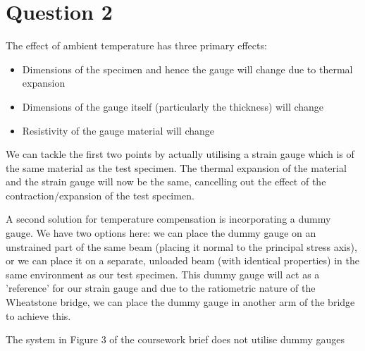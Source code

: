 \documentclass[12pt]{article}
\numberwithin{equation}{section}
\begin{document}
\section{Question 2}
The effect of ambient temperature has three primary effects:
\begin{itemize}
  \item Dimensions of the specimen and hence the gauge will change due to thermal expansion
  \item Dimensions of the gauge itself (particularly the thickness) will change
  \item Resistivity of the gauge material will change
\end{itemize}
We can tackle the first two points by actually utilising a strain gauge which is of the same material as the test specimen. The thermal expansion of the material and the strain gauge will now be the same, cancelling out the effect of the contraction/expansion of the test specimen.

A second solution for temperature compensation is incorporating a dummy gauge. We have two options here: we can place the dummy gauge on an unstrained part of the same beam (placing it normal to the principal stress axis), or we can place it on a separate, unloaded beam (with identical properties) in the same environment as our test specimen. This dummy gauge will act as a 'reference' for our strain gauge and due to the ratiometric nature of the Wheatstone bridge, we can place the dummy gauge in another arm of the bridge to achieve this. 

The system in Figure 3 of the coursework brief does not utilise dummy gauges
\end{document}
